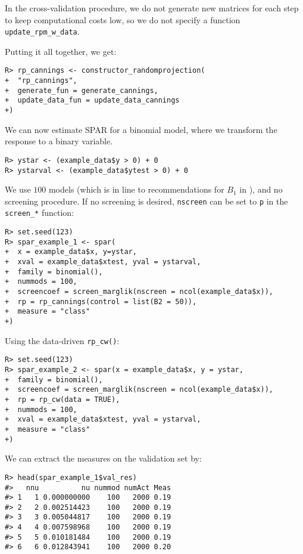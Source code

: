\documentclass[
  article]{jss}
\begin{document}
In the cross-validation procedure, we do not generate new matrices for
each step to keep computational costs low, so we do not specify a
function \texttt{update\_rpm\_w\_data}.

Putting it all together, we get:

\begin{verbatim}
R> rp_cannings <- constructor_randomprojection(
+  "rp_cannings",
+  generate_fun = generate_cannings,
+  update_data_fun = update_data_cannings
+)
\end{verbatim}

We can now estimate SPAR for a binomial model, where we transform the
response to a binary variable.

\begin{verbatim}
R> ystar <- (example_data$y > 0) + 0
R> ystarval <- (example_data$ytest > 0) + 0
\end{verbatim}

We use \(100\) models (which is in line to recommendations for \(B_1\)
in \citet{cannings2017random}), and no screening procedure. If no
screening is desired, \texttt{nscreen} can be set to \texttt{p} in the
\texttt{screen\_*} function:

\begin{verbatim}
R> set.seed(123)   
R> spar_example_1 <- spar(
+  x = example_data$x, y=ystar,
+  xval = example_data$xtest, yval = ystarval,
+  family = binomial(),
+  nummods = 100, 
+  screencoef = screen_marglik(nscreen = ncol(example_data$x)),
+  rp = rp_cannings(control = list(B2 = 50)),
+  measure = "class"
+)
\end{verbatim}

Using the data-driven \texttt{rp\_cw()}:

\begin{verbatim}
R> set.seed(123)   
R> spar_example_2 <- spar(x = example_data$x, y = ystar,
+  family = binomial(),
+  screencoef = screen_marglik(nscreen = ncol(example_data$x)),
+  rp = rp_cw(data = TRUE),
+  nummods = 100, 
+  xval = example_data$xtest, yval = ystarval,
+  measure = "class"
+)
\end{verbatim}

We can extract the measures on the validation set by:

\begin{verbatim}
R> head(spar_example_1$val_res)
#>   nnu          nu nummod numAct Meas
#> 1   1 0.000000000    100   2000 0.19
#> 2   2 0.002514423    100   2000 0.19
#> 3   3 0.005044817    100   2000 0.19
#> 4   4 0.007598968    100   2000 0.19
#> 5   5 0.010181484    100   2000 0.19
#> 6   6 0.012843941    100   2000 0.20
\end{verbatim}
\end{document}
